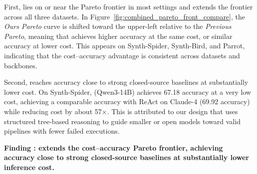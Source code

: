
First, \sys lies on or near the Pareto frontier in most settings and extends the frontier across all three datasets. In Figure~\ref{fig:combined_pareto_front_compare}, the \textit{Ours Pareto} curve is shifted toward the upper-left relative to the \textit{Previous Pareto}, meaning that \sys achieves higher accuracy at the same cost, or similar accuracy at lower cost. This appears on Synth-Spider, Synth-Bird, and Parrot, indicating that the cost–accuracy advantage is consistent across datasets and backbones.

Second, \sys reaches accuracy close to strong closed-source baselines at substantially lower cost. On Synth-Spider, \sys (Qwen3-14B) achieves 67.18 accuracy at a very low cost, achieving a comparable accuracy with ReAct on Claude-4 (69.92 accuracy) while reducing cost by about 57$\times$. 
This is attributed to our design that uses structured tree-based reasoning to guide smaller or open models toward valid pipelines with fewer failed executions.




\begin{shaded}
\noindent \textbf{Finding \findingnum: \sys extends the cost–accuracy Pareto frontier, achieving accuracy close to strong closed-source baselines at substantially lower inference cost.}
\end{shaded}